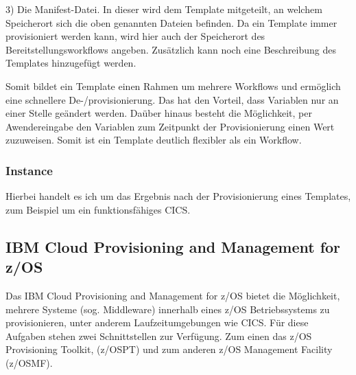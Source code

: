 3) Die Manifest-Datei.
In dieser wird dem Template mitgeteilt, an welchem Speicherort sich die oben genannten Dateien befinden.
Da ein Template immer provisioniert werden kann, wird hier auch der Speicherort des Bereitstellungsworkflows angeben.
Zusätzlich kann noch eine Beschreibung des Templates hinzugefügt werden.

Somit bildet ein Template einen Rahmen um mehrere Workflows und ermöglich eine schnellere De-/provisionierung.
Das hat den Vorteil, dass Variablen nur an einer Stelle geändert werden.
Daüber hinaus besteht die Möglichkeit, per Awendereingabe den Variablen zum Zeitpunkt der Provisionierung einen Wert zuzuweisen.
Somit ist ein Template deutlich flexibler als ein Workflow.
\cite{IBM.2019}

\subsubsection{Instance}\label{sssec:instance}
Hierbei handelt es ich um das Ergebnis nach der Provisionierung eines Templates,
zum Beispiel um ein funktionsfähiges CICS.

\subsection{IBM Cloud Provisioning and Management for z/OS}
Das IBM Cloud Provisioning and Management for z/OS bietet die Möglichkeit, mehrere Systeme (sog. Middleware) innerhalb eines z/OS Betriebssystems zu provisionieren, unter anderem Laufzeitumgebungen wie CICS. 
Für diese Aufgaben stehen zwei Schnittstellen zur Verfügung.
Zum einen das z/OS Provisioning Toolkit, (z/OSPT) und zum anderen z/OS Management Facility (z/OSMF).
\cite{KeithWinnardGaryPuchkoffHirenShah.2016}

